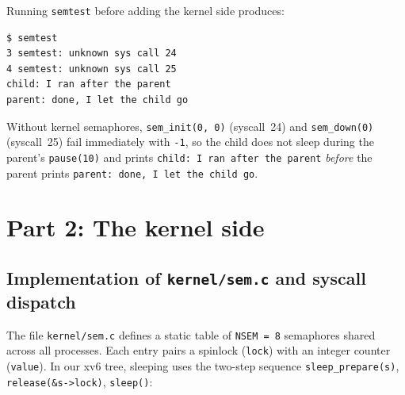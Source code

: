 \documentclass{../latex/utmreport}
\begin{document}
Running \texttt{semtest} before adding the kernel side produces:

\begin{lstlisting}
$ semtest
3 semtest: unknown sys call 24
4 semtest: unknown sys call 25
child: I ran after the parent
parent: done, I let the child go
\end{lstlisting}

Without kernel semaphores, \texttt{sem\_init(0, 0)} (syscall~24) and \texttt{sem\_down(0)} (syscall~25) fail immediately with \texttt{-1}, so the child does not sleep during the parent's \texttt{pause(10)} and prints \texttt{child: I ran after the parent} \emph{before} the parent prints \texttt{parent: done, I let the child go}.

\chapter{Part 2: The kernel side}

\section{Implementation of \texttt{kernel/sem.c} and syscall dispatch}

The file \texttt{kernel/sem.c} defines a static table of \texttt{NSEM = 8} semaphores shared across all processes. Each entry pairs a spinlock (\texttt{lock}) with an integer counter (\texttt{value}). In our xv6 tree, sleeping uses the two-step sequence \texttt{sleep\_prepare(s)}, \texttt{release(\&s->lock)}, \texttt{sleep()}:
\end{document}
